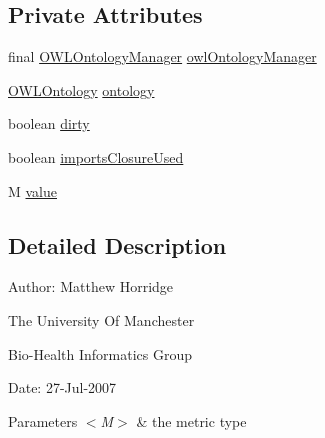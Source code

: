\subsection*{Private Attributes}
\begin{DoxyCompactItemize}
\item 
final \hyperlink{interfaceorg_1_1semanticweb_1_1owlapi_1_1model_1_1_o_w_l_ontology_manager}{O\-W\-L\-Ontology\-Manager} \hyperlink{classorg_1_1semanticweb_1_1owlapi_1_1metrics_1_1_abstract_o_w_l_metric_3_01_m_01_4_ad33c9afc47b32a87d47cd0c02dc120b1}{owl\-Ontology\-Manager}
\item 
\hyperlink{interfaceorg_1_1semanticweb_1_1owlapi_1_1model_1_1_o_w_l_ontology}{O\-W\-L\-Ontology} \hyperlink{classorg_1_1semanticweb_1_1owlapi_1_1metrics_1_1_abstract_o_w_l_metric_3_01_m_01_4_a1221622fc271e61624e89ad81aaa7288}{ontology}
\item 
boolean \hyperlink{classorg_1_1semanticweb_1_1owlapi_1_1metrics_1_1_abstract_o_w_l_metric_3_01_m_01_4_a43a88335762e10b8abe6dfe9af1bdcf1}{dirty}
\item 
boolean \hyperlink{classorg_1_1semanticweb_1_1owlapi_1_1metrics_1_1_abstract_o_w_l_metric_3_01_m_01_4_a6a2e075682b66e5542245c0338841682}{imports\-Closure\-Used}
\item 
M \hyperlink{classorg_1_1semanticweb_1_1owlapi_1_1metrics_1_1_abstract_o_w_l_metric_3_01_m_01_4_a29dcad7f5305f755737b0e8e79962b74}{value}
\end{DoxyCompactItemize}


\subsection{Detailed Description}
Author\-: Matthew Horridge\par
 The University Of Manchester\par
 Bio-\/\-Health Informatics Group\par
 Date\-: 27-\/\-Jul-\/2007\par
 \par



\begin{DoxyParams}{Parameters}
{\em $<$\-M$>$} & the metric type \\
\hline
\end{DoxyParams}


